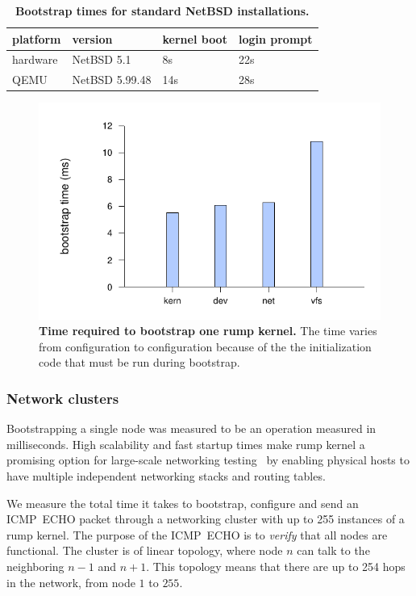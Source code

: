 \begin{table}[t]
\begin{tabular}{|l|l|l|l|}
\hline
platform & version & kernel boot & login prompt \\
\hline
\hline
hardware & NetBSD 5.1 & 8s & 22s \\
\hline
QEMU & NetBSD 5.99.48 & 14s & 28s \\
\hline
\end{tabular}
\caption[Bootstrap times for standard NetBSD installations]{
\textbf{Bootstrap times for standard NetBSD installations.}}
\label{tab:boottime}
\end{table}
\begin{figure}[t]
\includegraphics{soloboot}
\caption[Time required to bootstrap one rump kernel]{
\textbf{Time required to bootstrap one rump kernel.}
The time varies from configuration to configuration because of the
the initialization code that must be run during bootstrap.
}
\label{fig:soloboot}
\end{figure}

\subsubsection*{Network clusters}
\label{sect:netclust}

Bootstrapping a single node was measured to be an operation measured
in milliseconds.  High scalability and fast startup times make rump
kernel a promising option for large-scale networking
testing~\cite{hibler:emulab} by enabling physical hosts to have
multiple independent networking stacks and routing tables.

We measure the total time it takes to bootstrap, configure and send
an ICMP~ECHO packet through a networking cluster with up
to 255 instances of a rump kernel.  The purpose of the ICMP~ECHO
is to \textit{verify} that all nodes are functional.  The
cluster is of linear topology, where node $n$ can talk to
the neighboring $n-1$ and $n+1$.  This topology means that there are up to 254
hops in the network, from node $1$ to $255$.

